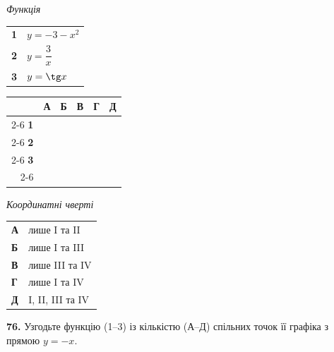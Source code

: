 \documentclass[14pt]{extarticle}
\newcommand{\answerGrid}{
    \begingroup
    \renewcommand{\arraystretch}{1.3} 
    \setlength{\tabcolsep}{7pt} 
    \begin{tabular}{r|c|c|c|c|c|}
         \multicolumn{1}{c}{} & \multicolumn{1}{c}{\textbf{А}} & \multicolumn{1}{c}{\textbf{Б}} & \multicolumn{1}{c}{\textbf{В}} & \multicolumn{1}{c}{\textbf{Г}} & \multicolumn{1}{c}{\textbf{Д}} \\ \cline{2-6}
         \textbf{1} & & & & & \\ \cline{2-6}
         \textbf{2} & & & & & \\ \cline{2-6}
         \textbf{3} & & & & & \\ \cline{2-6}
    \end{tabular}
    \endgroup
}
\begin{document}
\noindent
\begin{minipage}[t]{0.45\textwidth}
    \textit{Функція} \par \vspace{0.2cm}
    \begin{tabular}{@{}p{0.5cm} l@{}}
    \textbf{1} & $y=-3-x^2$ \\[0.4cm]
    \textbf{2} & $y=\dfrac{3}{x}$ \\[0.4cm]
    \textbf{3} & $y=\tg x$ \\
    \end{tabular}

    \vspace{1.0cm}
    \answerGrid
\end{minipage}%
\hfill
\begin{minipage}[t]{0.30\textwidth}
    \textit{Координатні чверті} \par \vspace{0.2cm}
    \begin{tabular}{@{}p{0.5cm} p{4cm}@{}}
    \textbf{А} & лише I та II \\[0.2cm]
    \textbf{Б} & лише I та III \\[0.2cm]
    \textbf{В} & лише III та IV \\[0.2cm]
    \textbf{Г} & лише I та IV \\[0.2cm]
    \textbf{Д} & I, II, III та IV \\
    \end{tabular}
\end{minipage}
\hfill
\begin{minipage}[t]{0.20\textwidth}
    \vspace{0.5cm}
\end{minipage}

\vspace{0.7cm}

\noindent\textbf{76.} Узгодьте функцію (1--3) із кількістю (А--Д) спільних точок її графіка з прямою $y=-x$.

\vspace{0.3cm}
\end{document}
